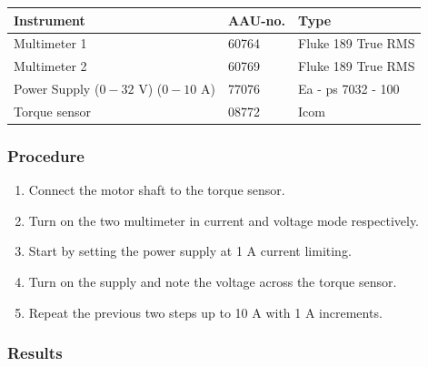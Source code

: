 \begin{table}[H]
\begin{tabular}{|l|l|p{4cm}|}
\hline%
  \textbf{Instrument}                        &  \textbf{AAU-no.}  &  \textbf{Type}       \\
\hline%
  Multimeter 1                               &  60764             &  Fluke 189 True RMS  \\
\hline%
  Multimeter 2                   		         &  60769             &  Fluke 189 True RMS  \\
\hline%
  Power Supply ($0 - 32$ V) ($0 - 10$ A)     &  77076             &  Ea - ps 7032 - 100  \\
\hline%
  Torque sensor                              &  08772             &  Icom                \\
\hline%
\end{tabular}
\end{table}

\subsubsection{Procedure}

\begin{enumerate}
  \item Connect the motor shaft to the torque sensor.
  \item Turn on the two multimeter in current and voltage mode respectively.
  \item Start by setting the power supply at 1 A current limiting.
  \item Turn on the supply and note the voltage across the torque sensor.
  \item Repeat the previous two steps up to 10 A with 1 A increments.
\end{enumerate}

\subsubsection{Results}

